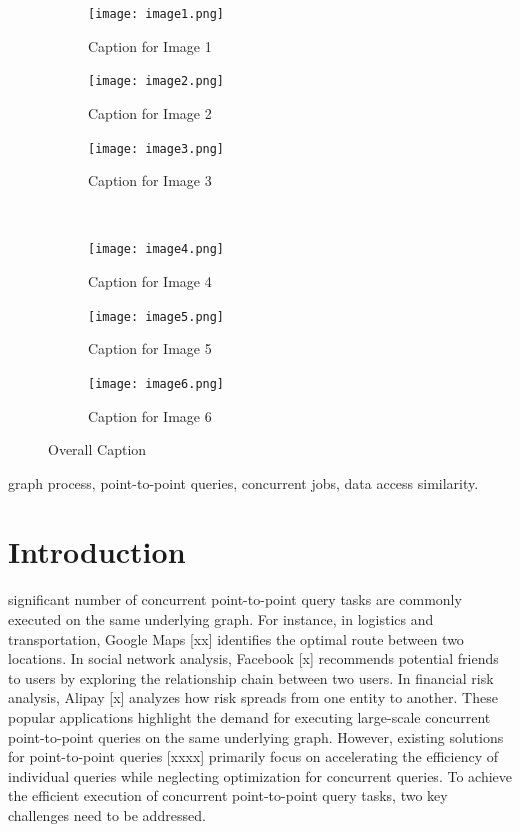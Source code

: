\documentclass[lettersize,journal]{IEEEtran} %
\begin{document}
\begin{figure}[t]
    \centering
    \begin{subfigure}{.3\textwidth}
      \texttt{[image: image1.png]}
      \caption{Caption for Image 1}
      \label{fig:sub1}
    \end{subfigure}%
    \begin{subfigure}{.3\textwidth}
      \texttt{[image: image2.png]}
      \caption{Caption for Image 2}
      \label{fig:sub2}
    \end{subfigure}%
    \begin{subfigure}{.3\textwidth}
      \texttt{[image: image3.png]}
      \caption{Caption for Image 3}
      \label{fig:sub3}
    \end{subfigure}\\
    \begin{subfigure}{.3\textwidth}
      \texttt{[image: image4.png]}
      \caption{Caption for Image 4}
      \label{fig:sub4}
    \end{subfigure}%
    \begin{subfigure}{.3\textwidth}
      \texttt{[image: image5.png]}
      \caption{Caption for Image 5}
      \label{fig:sub5}
    \end{subfigure}%
    \begin{subfigure}{.3\textwidth}
      \texttt{[image: image6.png]}
      \caption{Caption for Image 6}
      \label{fig:sub6}
    \end{subfigure}%
    \caption{Overall Caption}
    \label{fig:overall_label}
  \end{figure}


\begin{IEEEkeywords}
graph process, point-to-point queries, concurrent jobs, data access similarity.
\end{IEEEkeywords}


\section{Introduction}
 significant number of concurrent point-to-point query tasks are commonly executed on the same underlying graph. For instance, in logistics and transportation, Google Maps [xx] identifies the optimal route between two locations. In social network analysis, Facebook [x] recommends potential friends to users by exploring the relationship chain between two users. In financial risk analysis, Alipay [x] analyzes how risk spreads from one entity to another. These popular applications highlight the demand for executing large-scale concurrent point-to-point queries on the same underlying graph. However, existing solutions for point-to-point queries [xxxx] primarily focus on accelerating the efficiency of individual queries while neglecting optimization for concurrent queries. To achieve the efficient execution of concurrent point-to-point query tasks, two key challenges need to be addressed.
\end{document}
